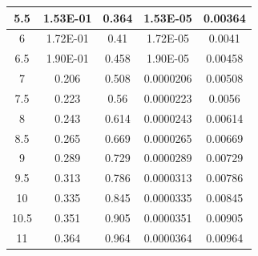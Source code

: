 \documentclass[11pt, a4paper, twocolumn]{article}
\begin{document}
\begin{longtable}[c]{|
>{\columncolor[HTML]{EFEFEF}}c |c|c|c|c|}
5.5                & 1.53E-01                               & 0.364                                   & 1.53E-05                               & 0.00364                                 \\ \hline
6                  & 1.72E-01                               & 0.41                                    & 1.72E-05                               & 0.0041                                  \\ \hline
6.5                & 1.90E-01                               & 0.458                                   & 1.90E-05                               & 0.00458                                 \\ \hline
7                  & 0.206                                  & 0.508                                   & 0.0000206                              & 0.00508                                 \\ \hline
7.5                & 0.223                                  & 0.56                                    & 0.0000223                              & 0.0056                                  \\ \hline
8                  & 0.243                                  & 0.614                                   & 0.0000243                              & 0.00614                                 \\ \hline
8.5                & 0.265                                  & 0.669                                   & 0.0000265                              & 0.00669                                 \\ \hline
9                  & 0.289                                  & 0.729                                   & 0.0000289                              & 0.00729                                 \\ \hline
9.5                & 0.313                                  & 0.786                                   & 0.0000313                              & 0.00786                                 \\ \hline
10                 & 0.335                                  & 0.845                                   & 0.0000335                              & 0.00845                                 \\ \hline
10.5               & 0.351                                  & 0.905                                   & 0.0000351                              & 0.00905                                 \\ \hline
11                 & 0.364                                  & 0.964                                   & 0.0000364                              & 0.00964                                 \\ \hline

\end{longtable}
\end{document}
